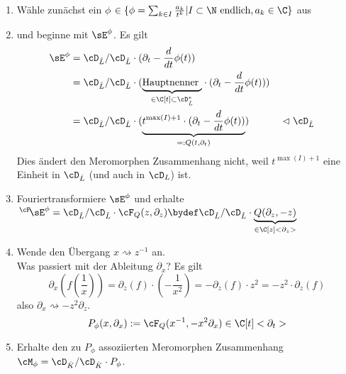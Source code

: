 \begin{enumerate}
\item Wähle zunächst ein $\phi$
$\in\{\phi=\sum_{k\in I}\frac{a_k}{t^{k}}|I\subset\N\mbox{ endlich}
,a_k\in \C\}$
aus
\item und beginne mit $\sE^{\phi}$. Es gilt
\begin{align*}
\sE^{\phi} &= \cD_{\hat L}/\cD_{\hat L}\cdot (\partial_t-\frac{d}{dt}\phi(t))
\\&=\cD_{\hat L}/\cD_{\hat L}\cdot (\underset{\in\C[t]\subset\cD_{\hat L}^*}
    {\underbrace{\mbox{Hauptnenner }}}
  \cdot (\partial_t-\frac{d}{dt}\phi(t)))
\\&=\cD_{\hat L}/\cD_{\hat L}\cdot ( \underset{=:Q(t,\partial_t)}{\underbrace{
  t^{\max(I)+1} \cdot (\partial_t-\frac{d}{dt}\phi(t))}})
  & & \vartriangleleft\cD_{\hat L}
\end{align*}
Dies ändert den Meromorphen Zusammenhang nicht, weil $t^{\max(I)+1}$ eine
Einheit in $\cD_{\hat L}$ (und auch in $\cD_{L}$) ist.
\iffalse
  \item und beginne mit $\sE^{\phi}=\cD_{\hat L}/\cD_{\hat L}\cdot \tilde Q$
  mit
  $ \tilde Q(t,\partial_t):=\partial_t-\frac{d}{dt}\phi(t)$
  $\in\C[t,t^{-1}]<\partial_t>$.
  \item Wir wollen aber ein Element in $\C[t]<\partial_t>$,
  deshalb multipliziere mit Hauptnenner und erhalte
  \begin{align*}
  \cD_{\hat L}\cdot \tilde Q(t,\partial_t)
    &=\cD_{\hat L}\cdot (\underset{\in\C[t]\subset\cD_{\hat L}^*}
      {\underbrace{\mbox{Hauptnenner }}}
    \cdot (\partial_t-\frac{d}{dt}\phi(t))) \\
  &=\cD_{\hat L}\cdot ( \underset{=:Q(t,\partial_t)}{\underbrace{
    t^{\max(I)+1} \cdot (\partial_t-\frac{d}{dt}\phi(t))}})
    & & \vartriangleleft\cD_{\hat L}
  \end{align*}
  mit $Q\in\C[t]<\partial_t>$.
\fi
\item Fouriertransformiere $\sE^{\phi}$ und erhalte
$
\,^\cF\!\sE^{\phi}=\cD_{\hat L}/\cD_{\hat L}\cdot{\cF_Q(z,\partial_z)}
\bydef \cD_{\hat L}/\cD_{\hat L}\cdot 
\underset{\in\C[z]<\partial_z>}{\underbrace{Q(\partial_z,-z)}}
$
\item Wende den Übergang $x\rightsquigarrow z^{-1}$ an.\\
Was passiert mit der Ableitung $\partial_x$? Es gilt
\[
\partial_x (f(\frac{1}{x}))=
\partial_z(f)\cdot (-\frac{1}{x^2})=
-\partial_z(f)\cdot z^2= %
- z^2 \cdot \partial_z(f)
\]
also $ \partial_x\rightsquigarrow-z^2\partial_z $.
\[
P_\phi(x,\partial_x):=\cF_Q(x^{-1},-x^2\partial_x) \in \C[t]<\partial_t>
\]
\item Erhalte den zu $P_\phi$ assoziierten Meromorphen Zusammenhang
$\cM_\phi=\cD_{\hat K}/\cD_{\hat K}\cdot P_{\phi}$.
\end{enumerate}

